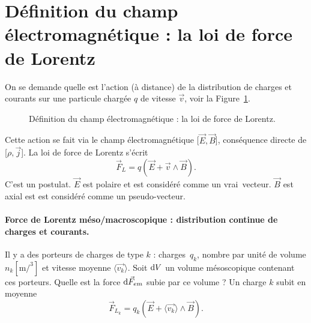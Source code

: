 \section[La loi de force de Lorentz]{Définition du champ électromagnétique : la loi de force de Lorentz}

    On se demande quelle est l'action (à distance) de la distribution de charges et courants sur une particule chargée $q$ de vitesse $\vec{v}$, voir la Figure~\ref{fig:definition_champ_em_loi_force_lorentz}.

    \begin{figure}
        \centering
        \caption{Définition du champ électromagnétique : la loi de force de Lorentz.}    
        \label{fig:definition_champ_em_loi_force_lorentz}
    \end{figure}

    Cette action se fait via le champ électromagnétique [$\vec{E},\vec{B}$], conséquence directe de [$\rho,\vec{j}$]. La loi de force de Lorentz s'écrit
    \begin{equation}
        \boxed{
            \vec{F}_L = q\left(\vec{E}+\vec{v}\wedge\vec{B}\right).
        }
    \end{equation}
    C'est un postulat. $\vec{E}$ est polaire et est considéré comme un \og vrai\fg~vecteur. $\vec{B}$ est axial est est considéré comme un \og pseudo-vecteur\fg.

    \paragraph{Force de Lorentz méso/macroscopique : distribution continue de charges et courants.}

        Il y a des porteurs de charges de type $k$ : charges~$q_k$, nombre par unité de volume $n_k [\si{\metre\per\cubed}]$ et vitesse moyenne $\langle\vec{v_k}\rangle$. Soit $\mathrm{d} V$ un volume mésoscopique contenant ces porteurs. Quelle est la force $\mathrm{d}\vec{F}_{em}$ subie par ce volume ? Un charge $k$ subit en moyenne 
        \begin{equation}
            \vec{F}_{L_k}=q_k\left(\vec{E}+\langle\vec{v_k}\rangle\wedge \vec{B}\right).
        \end{equation}

